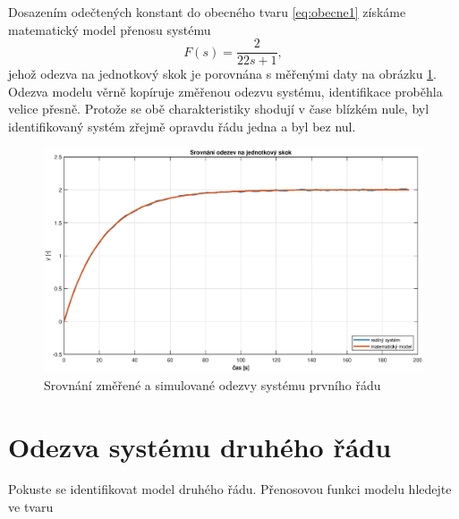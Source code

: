 \documentclass[twoside]{article}
\begin{document}
Dosazením odečtených konstant do obecného tvaru \eqref{eq:obecne1} získáme matematický model přenosu systému 
\begin{equation}
	F(s) = \frac{2}{22s + 1},
\end{equation}
jehož odezva na jednotkový skok je porovnána s měřenými daty na obrázku \ref{fig:zaver1}. Odezva modelu
věrně kopíruje změřenou odezvu systému, identifikace proběhla velice přesně. Protože se obě charakteristiky shodují
v čase blízkém nule, byl identifikovaný systém zřejmě opravdu řádu jedna a byl bez nul.
\begin{figure}
	\centering
	\includegraphics[width=\linewidth]{odezvy1_zaver.eps}
	\caption{Srovnání změřené a simulované odezvy systému prvního řádu}
	\label{fig:zaver1}
\end{figure}

\section{Odezva systému druhého řádu}
Pokuste se identifikovat model druhého řádu. Přenosovou funkci modelu hledejte ve tvaru
\end{document}
